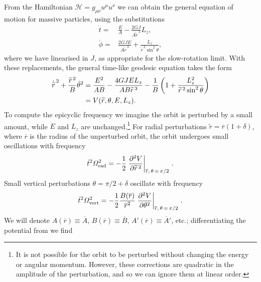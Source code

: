 From the Hamiltonian $\mathcal{H} = g_{\mu\nu}u^\mu u^\nu$ we can obtain the general equation of motion for massive particles, using the substitutions
\begin{align}
\dot{t} = {} & \frac{E}{A} -\frac{2GJ}{A\widetilde{r}^{\,3}}L_z, \\
\dot{\phi} = {} &  \frac{2GJE}{A\widetilde{r}^{\,3}} + \frac{L_z}{\widetilde{r}^{\,2} \sin^2\theta},
\end{align}
where we have linearised in $J$, as appropriate for the slow-rotation limit. With these replacements, the general time-like geodesic equation takes the form
\begin{align}
\dot{\widetilde{r}}^{\,2} + \frac{\widetilde{r}^{\,2}}{B} \dot{\theta}^2 = {} & \frac{E^2}{AB} -\frac{4GJEL_z}{AB \widetilde{r}^{\,3}}- \frac{1}{B}\left(1 + \frac{L_z^2}{\widetilde{r}^{\,2}\sin^2\theta}\right) \nonumber \\*
 = {} & V(\widetilde{r},\theta,E,L_z).
\label{eq:rdot}
\end{align}
To compute the epicyclic frequency we imagine the orbit is perturbed by a small amount, while $E$ and $L_z$ are unchanged.\footnote{It is not possible for the orbit to be perturbed without changing the energy or angular momentum. However, these corrections are quadratic in the amplitude of the perturbation, and so we can ignore them at linear order.} For radial perturbations $\widetilde{r} = \overline{r}(1 + \delta)$, where $\overline{r}$ is the radius of the unperturbed orbit, the orbit undergoes small oscillations with frequency
\begin{equation}
\dot{t}^2\Omega_\mathrm{rad}^2 = -\frac{1}{2} \left. \frac{\partial {^2 V}}{\partial {\widetilde{r}^{\,2}}}\right|_{\overline{r},\,\theta\,=\,\pi/2\,}.
\end{equation}
Small vertical perturbations $\theta = \pi/2 + \delta$ oscillate with frequency
\begin{equation}
\dot{t}^2\Omega_\mathrm{vert}^2 = -\frac{1}{2} \frac{B(\overline{r})}{\overline{r}^2} \left. \frac{\partial {^2 V}}{\partial {\theta^2}}\right|_{\overline{r},\,\theta\,=\,\pi/2\,}.
\end{equation}
We will denote $A(\overline{r}) \equiv \overline{A}$, $B(\overline{r}) \equiv \overline{B}$, $A'(\overline{r}) \equiv \overline{A}'$, etc.; differentiating the potential from  we find

